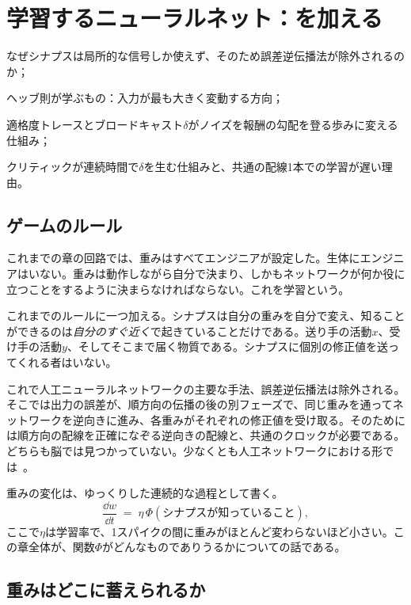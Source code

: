 \chapter{学習するニューラルネット：を加える}
\label{sec:dofa}
\begin{chaptergoals}
\item なぜシナプスは局所的な信号しか使えず、そのため誤差逆伝播法が除外されるのか；
\item ヘッブ則が学ぶもの：入力が最も大きく変動する方向；
\item 適格度トレースとブロードキャスト$\delta$がノイズを報酬の勾配を登る歩みに変える仕組み；
\item クリティックが連続時間で$\delta$を生む仕組みと、共通の配線1本での学習が遅い理由。
\end{chaptergoals}

\section{ゲームのルール}

これまでの章の回路では、重みはすべてエンジニアが設定した。生体にエンジニアはいない。重みは動作しながら自分で決まり、しかもネットワークが何か役に立つことをするように決まらなければならない。これを学習という。

これまでのルールに一つ加える。シナプスは自分の重みを自分で変え、知ることができるのは\emph{自分のすぐ近く}で起きていることだけである。送り手の活動$x$、受け手の活動$y$、そしてそこまで届く物質である。シナプスに個別の修正値を送ってくれる者はいない。

これで人工ニューラルネットワークの主要な手法、誤差逆伝播法は除外される。そこでは出力の誤差が、順方向の伝播の後の別フェーズで、同じ重みを通ってネットワークを逆向きに進み、各重みがそれぞれの修正値を受け取る。そのためには順方向の配線を正確になぞる逆向きの配線と、共通のクロックが必要である。どちらも脳では見つかっていない。少なくとも人工ネットワークにおける形では~\cite{Lillicrap2020,WhittingtonBogacz2019}。

重みの変化は、ゆっくりした連続的な過程として書く。
\begin{equation}
\frac{\dd w}{\dd t} \;=\; \eta\,\Phi(\text{シナプスが知っていること}),
\label{eq:plasticity}
\end{equation}
ここで$\eta$は学習率で、1スパイクの間に重みがほとんど変わらないほど小さい。この章全体が、関数$\Phi$がどんなものでありうるかについての話である。

\section{重みはどこに蓄えられるか}
\label{sec:weightstore}

